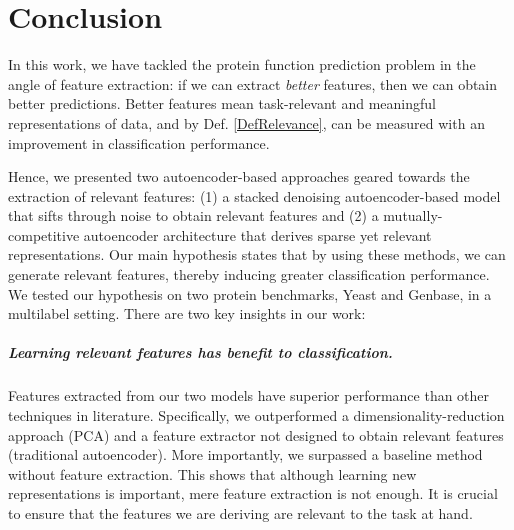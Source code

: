 %
%
%
%
%
\chapter{Conclusion}
\label{ConclusionsChapter}

\par In this work, we have tackled the protein function prediction problem in
the angle of feature extraction: if we can extract \emph{better} features, then
we can obtain better predictions. Better features mean task-relevant and
meaningful representations of data, and by Def. \ref{DefRelevance}, can be
measured with an improvement in classification performance. 

\par Hence, we presented two autoencoder-based approaches geared towards the
extraction of relevant features: (1) a stacked denoising autoencoder-based
model that sifts through noise to obtain relevant features and (2) a
mutually-competitive autoencoder architecture that derives sparse yet relevant
representations. Our main hypothesis states that by using these methods, we can
generate relevant features, thereby inducing greater classification
performance. We tested our hypothesis on two protein benchmarks, Yeast and
Genbase, in a multilabel setting. There are two key insights in our work:


\paragraph{Learning relevant features has benefit to classification.}
Features extracted from our two models have superior performance than other
techniques in literature. Specifically, we outperformed a
dimensionality-reduction approach (PCA) and a feature extractor not designed to
obtain relevant features (traditional autoencoder). More importantly, we
surpassed a baseline method without feature extraction. This shows that
although learning new representations is important, mere feature extraction is
not enough. It is crucial to ensure that the features we are deriving are
relevant to the task at hand. 

